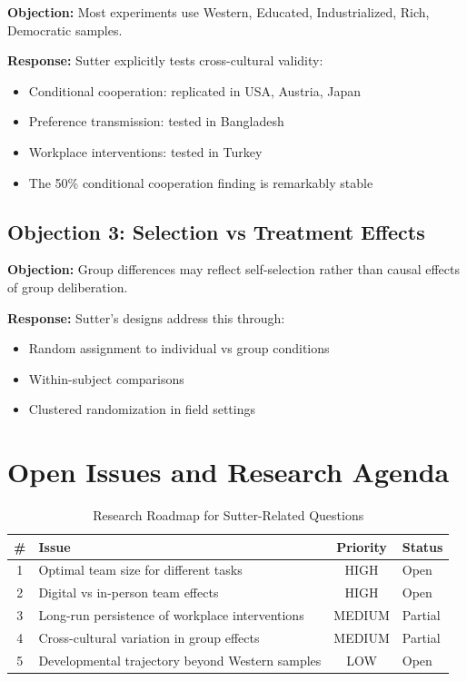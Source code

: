 \textbf{Objection:} Most experiments use Western, Educated, Industrialized, Rich, Democratic samples.

\textbf{Response:} Sutter explicitly tests cross-cultural validity:
\begin{itemize}
\item Conditional cooperation: replicated in USA, Austria, Japan \citep{kocher2008conditional}
\item Preference transmission: tested in Bangladesh \citep{chowdhury2022preferences}
\item Workplace interventions: tested in Turkey \citep{alan2023workplace}
\item The 50\% conditional cooperation finding is remarkably stable
\end{itemize}

\subsection{Objection 3: Selection vs Treatment Effects}

\textbf{Objection:} Group differences may reflect self-selection rather than causal effects of group deliberation.

\textbf{Response:} Sutter's designs address this through:
\begin{itemize}
\item Random assignment to individual vs group conditions
\item Within-subject comparisons \citep{luhan2009polarization}
\item Clustered randomization in field settings \citep{alan2023workplace}
\end{itemize}


\section{Open Issues and Research Agenda}
\label{sec:su-open}

\begin{table}[htbp]
\centering
\caption{Research Roadmap for Sutter-Related Questions}
\label{tab:su-roadmap}
\renewcommand{\arraystretch}{1.3}
\begin{tabular}{@{}clcl@{}}
\toprule
\textbf{\#} & \textbf{Issue} & \textbf{Priority} & \textbf{Status} \\
\midrule
1 & Optimal team size for different tasks & HIGH & Open \\
2 & Digital vs in-person team effects & HIGH & Open \\
3 & Long-run persistence of workplace interventions & MEDIUM & Partial \\
4 & Cross-cultural variation in group effects & MEDIUM & Partial \\
5 & Developmental trajectory beyond Western samples & LOW & Open \\
\bottomrule
\end{tabular}
\end{table}


